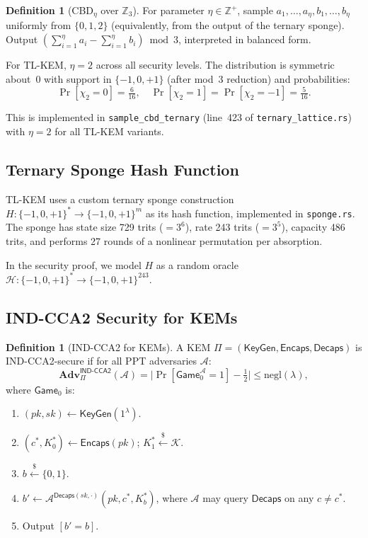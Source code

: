 \documentclass[11pt,a4paper]{article}
\theoremstyle{definition}
\newtheorem{definition}[theorem]{Definition}
\newcommand{\Z}{\mathbb{Z}}
\newcommand{\Adv}{\mathbf{Adv}}
\newcommand{\negl}{\mathrm{negl}}
\newcommand{\KeyGen}{\textsf{KeyGen}}
\newcommand{\Encaps}{\textsf{Encaps}}
\newcommand{\Decaps}{\textsf{Decaps}}
\newcommand{\INDCCA}{\textsf{IND-CCA2}}
\newcommand{\Hash}{\mathcal{H}}
\begin{document}
\begin{definition}[CBD$_\eta$ over $\Z_3$]
\label{def:cbd}
For parameter $\eta \in \Z^+$, sample $a_1, \ldots, a_\eta, b_1, \ldots, b_\eta$ uniformly from $\{0, 1, 2\}$ (equivalently, from the output of the ternary sponge). Output $\left(\sum_{i=1}^\eta a_i - \sum_{i=1}^\eta b_i\right) \bmod 3$, interpreted in balanced form.

For TL-KEM, $\eta = 2$ across all security levels. The distribution is symmetric about~0 with support in $\{-1,0,+1\}$ (after mod~3 reduction) and probabilities:
\[
  \Pr[\chi_2 = 0] = \tfrac{6}{16}, \quad
  \Pr[\chi_2 = 1] = \Pr[\chi_2 = -1] = \tfrac{5}{16}.
\]
\end{definition}

This is implemented in \texttt{sample\_cbd\_ternary} (line~423 of \texttt{ternary\_lattice.rs}) with $\eta = 2$ for all TL-KEM variants.

\subsection{Ternary Sponge Hash Function}

TL-KEM uses a custom ternary sponge construction $H: \{-1,0,+1\}^* \to \{-1,0,+1\}^m$ as its hash function, implemented in \texttt{sponge.rs}. The sponge has state size 729 trits ($= 3^6$), rate 243 trits ($= 3^5$), capacity 486 trits, and performs 27 rounds of a nonlinear permutation per absorption.

In the security proof, we model $H$ as a random oracle $\Hash: \{-1,0,+1\}^* \to \{-1,0,+1\}^{243}$.

\subsection{IND-CCA2 Security for KEMs}

\begin{definition}[IND-CCA2 for KEMs]
\label{def:ind-cca2}
A KEM $\Pi = (\KeyGen, \Encaps, \Decaps)$ is IND-CCA2-secure if for all PPT adversaries $\mathcal{A}$:
\[
  \Adv^{\INDCCA}_\Pi(\mathcal{A})
  = \bigl| \Pr[\mathsf{Game}_0^{\mathcal{A}} = 1]
    - \tfrac{1}{2} \bigr| \leq \negl(\lambda),
\]
where $\mathsf{Game}_0$ is:
\begin{enumerate}[leftmargin=2em]
  \item $(pk, sk) \leftarrow \KeyGen(1^\lambda)$.
  \item $(c^*, K_0^*) \leftarrow \Encaps(pk)$; $K_1^* \xleftarrow{\$} \mathcal{K}$.
  \item $b \xleftarrow{\$} \{0,1\}$.
  \item $b' \leftarrow \mathcal{A}^{\Decaps(sk,\cdot)}(pk, c^*, K_b^*)$, where $\mathcal{A}$ may query $\Decaps$ on any $c \neq c^*$.
  \item Output $[b' = b]$.
\end{enumerate}
\end{definition}
\end{document}
